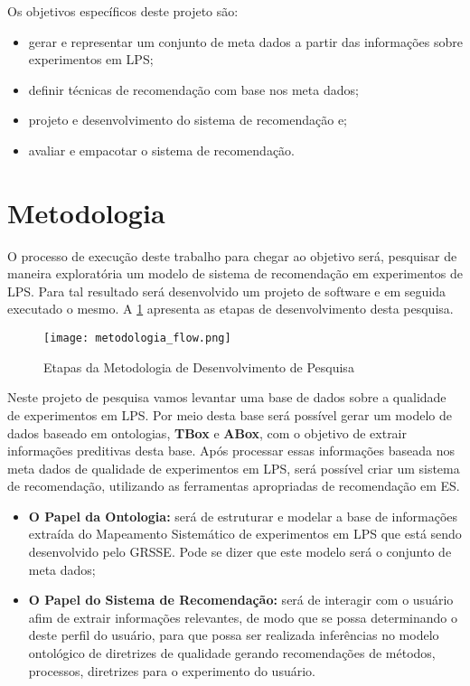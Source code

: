 Os objetivos específicos deste projeto são:

\begin{itemize}
	\item gerar e representar um conjunto de meta dados a partir das informações sobre experimentos em LPS;
	\item definir técnicas de recomendação com base nos meta dados;
	\item projeto e desenvolvimento do sistema de recomendação e;
	\item avaliar e empacotar o sistema de recomendação.
\end{itemize}

\section{Metodologia}
\label{sec:meto}

O processo de execução deste trabalho para chegar ao objetivo será, pesquisar de maneira exploratória um modelo de sistema de recomendação em experimentos de LPS. Para tal resultado será desenvolvido um projeto de software e em seguida executado o mesmo. A \ref{fig:metodologia_flow} apresenta as etapas de desenvolvimento desta pesquisa.

\begin{figure}[htb]
	\centering					
	{\texttt{[image: metodologia\_flow.png]}}
	
	\caption{Etapas da Metodologia de Desenvolvimento de Pesquisa}
	\label{fig:metodologia_flow}
\end{figure}

Neste projeto de pesquisa vamos levantar uma base de dados sobre a qualidade de experimentos em LPS. Por meio desta base será possível gerar um modelo de dados baseado em ontologias, \textbf{TBox} e \textbf{ABox}, com o objetivo de extrair informações preditivas desta base. Após processar essas informações baseada nos meta dados de qualidade de experimentos em LPS, será possível criar um sistema de recomendação, utilizando as ferramentas apropriadas de recomendação em ES.

\begin{itemize}
	\item \textbf{O Papel da Ontologia:} será de estruturar e modelar a base de informações extraída do Mapeamento Sistemático de experimentos em LPS que está sendo desenvolvido pelo GRSSE. Pode se dizer que este modelo será o conjunto de meta dados;
	
	\item \textbf{O Papel do Sistema de Recomendação:} será de interagir com o usuário afim de extrair informações relevantes, de modo que se possa determinando o deste perfil do usuário, para que possa ser realizada inferências no modelo ontológico de diretrizes de qualidade gerando recomendações de métodos, processos, diretrizes para o experimento do usuário.
\end{itemize}

